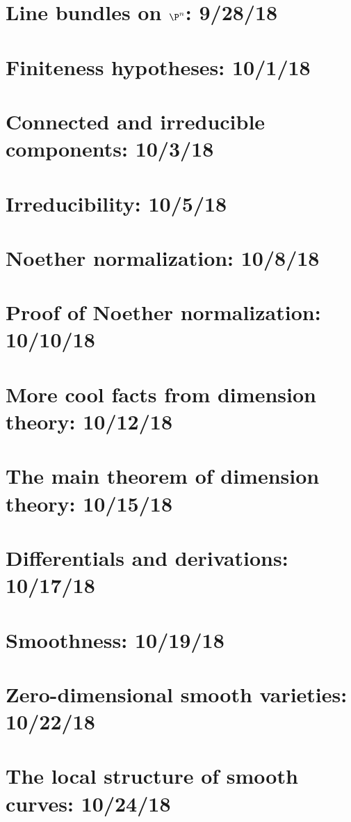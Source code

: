 \documentclass{notes_d}
\begin{document}
\section{Line bundles on $\P^n$: 9/28/18}
	
\section{Finiteness hypotheses: 10/1/18}
	
\section{Connected and irreducible components: 10/3/18}
	
\section{Irreducibility: 10/5/18}
	
\section{Noether normalization: 10/8/18}
	
\section{Proof of Noether normalization: 10/10/18}
	
\section{More cool facts from dimension theory: 10/12/18}
	
\section{The main theorem of dimension theory: 10/15/18}
	
\section{Differentials and derivations: 10/17/18}
	
\section{Smoothness: 10/19/18}
	
\section{Zero-dimensional smooth varieties: 10/22/18}
	
\section{The local structure of smooth curves: 10/24/18}
	
\end{document}
